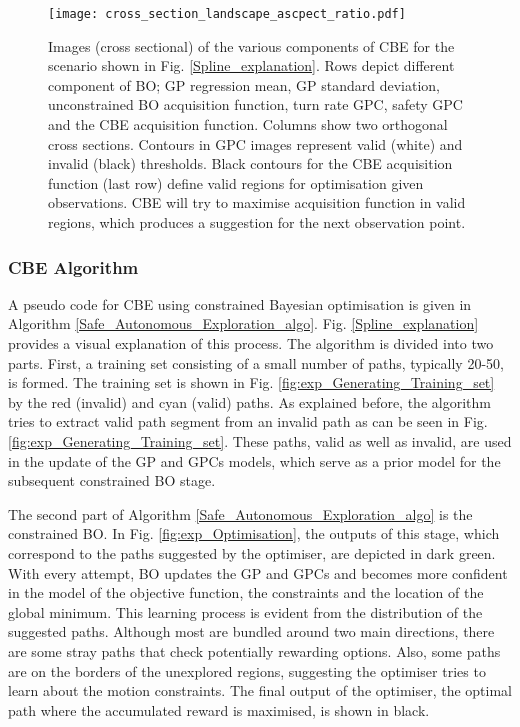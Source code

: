 \documentclass[shortAfour,sageh,times]{sagej_no_sage}
\begin{document}
\begin{figure*}[htbp]
	
	\centering
	
	\texttt{[image: cross\_section\_landscape\_ascpect\_ratio.pdf]}
	
	\caption{Images (cross sectional) of the various components of CBE for the scenario shown in Fig. \ref{Spline_explanation}. Rows depict different component of BO; GP regression mean, GP standard deviation, unconstrained BO acquisition function, turn rate GPC, safety GPC and the CBE acquisition function. Columns show two orthogonal cross sections. Contours in GPC images represent valid (white) and invalid (black) thresholds. Black contours for the CBE acquisition function (last row) define valid regions for optimisation given observations. CBE will try to maximise acquisition function in valid regions, which produces a suggestion for the next observation point.    }
	\label{fig:Spline_BO_example}
\end{figure*}

\subsubsection{CBE Algorithm}	\hfill \break

A pseudo code for CBE using constrained Bayesian optimisation is given in Algorithm \ref{Safe_Autonomous_Exploration_algo}. Fig. \ref{Spline_explanation} provides a visual explanation of this process. The algorithm is divided into two parts. First, a training set consisting of a small number of paths, typically 20-50, is formed. The training set is shown in Fig. \ref{fig:exp_Generating_Training_set} by the red (invalid) and cyan (valid) paths. As explained before, the algorithm tries to extract valid path segment from an invalid path as can be seen in Fig. \ref{fig:exp_Generating_Training_set}. These paths, valid as well as invalid, are used in the update of the GP and GPCs models, which serve as a prior model for the subsequent constrained BO stage. 

The second part of Algorithm \ref{Safe_Autonomous_Exploration_algo} is the constrained BO. In Fig. \ref{fig:exp_Optimisation}, the outputs of this stage, which correspond to the paths suggested by the optimiser, are depicted in dark green. With every attempt, BO updates the GP and GPCs and becomes more confident in the model of the objective function, the constraints and the location of the global minimum. This learning process is evident from the distribution of the suggested paths. Although most are bundled around two main directions, there are some stray paths that check potentially rewarding options. Also, some paths are on the borders of the unexplored regions, suggesting the optimiser tries to learn about the motion constraints. The final output of the optimiser, the optimal path where the accumulated reward is maximised, is shown in black.
\end{document}
